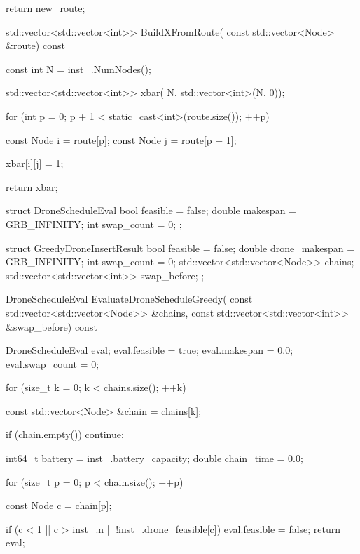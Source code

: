 {{{{                return new_route;
            }

            std::vector<std::vector<int>> BuildXFromRoute(
                const std::vector<Node> &route) const
            {
                const int N = inst_.NumNodes();

                std::vector<std::vector<int>> xbar(
                    N,
                    std::vector<int>(N, 0));

                for (int p = 0; p + 1 < static_cast<int>(route.size()); ++p)
                {
                    const Node i = route[p];
                    const Node j = route[p + 1];

                    xbar[i][j] = 1;
                }

                return xbar;
            }

            struct DroneScheduleEval
            {
                bool feasible = false;
                double makespan = GRB_INFINITY;
                int swap_count = 0;
            };

            struct GreedyDroneInsertResult
            {
                bool feasible = false;
                double drone_makespan = GRB_INFINITY;
                int swap_count = 0;
                std::vector<std::vector<Node>> chains;
                std::vector<std::vector<int>> swap_before;
            };

            DroneScheduleEval EvaluateDroneScheduleGreedy(
                const std::vector<std::vector<Node>> &chains,
                const std::vector<std::vector<int>> &swap_before) const
            {
                DroneScheduleEval eval;
                eval.feasible = true;
                eval.makespan = 0.0;
                eval.swap_count = 0;

                for (size_t k = 0; k < chains.size(); ++k)
                {
                    const std::vector<Node> &chain = chains[k];

                    if (chain.empty())
                    {
                        continue;
                    }

                    int64_t battery = inst_.battery_capacity;
                    double chain_time = 0.0;

                    for (size_t p = 0; p < chain.size(); ++p)
                    {
                        const Node c = chain[p];

                        if (c < 1 || c > inst_.n || !inst_.drone_feasible[c])
                        {
                            eval.feasible = false;
                            return eval;
                        }

}}}}}}
